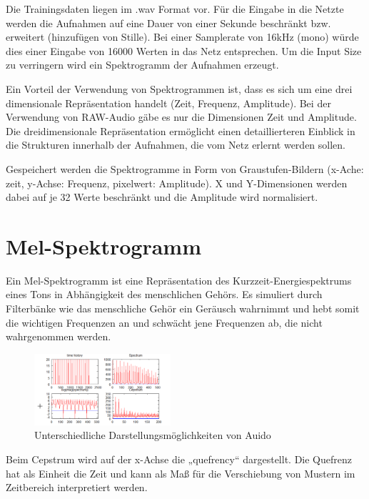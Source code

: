 \documentclass[sigconf]{acmart}
\begin{document}
Die Trainingsdaten liegen im .wav Format vor. Für die Eingabe in die Netzte werden die Aufnahmen auf eine Dauer von einer Sekunde beschränkt bzw. erweitert (hinzufügen von Stille). Bei einer Samplerate von 16kHz (mono) würde dies einer Eingabe von 16000 Werten in das Netz entsprechen. Um die Input Size zu verringern wird ein Spektrogramm der Aufnahmen erzeugt.  

Ein Vorteil der Verwendung von Spektrogrammen ist, dass es sich um eine drei dimensionale Repräsentation handelt (Zeit, Frequenz, Amplitude). Bei der Verwendung von RAW-Audio gäbe es nur die Dimensionen Zeit und Amplitude. Die dreidimensionale Repräsentation ermöglicht einen detaillierteren Einblick in die Strukturen innerhalb der Aufnahmen, die vom Netz erlernt werden sollen. 

Gespeichert werden die Spektrogramme in Form von Graustufen-Bildern (x-Ache: zeit, y-Achse: Frequenz, pixelwert: Amplitude). X und Y-Dimensionen werden dabei auf je 32 Werte beschränkt und die Amplitude wird normalisiert. 

\section{Mel-Spektrogramm}
Ein Mel-Spektrogramm ist eine Repräsentation des Kurzzeit-Energiespektrums eines Tons in Abhängigkeit des menschlichen Gehörs. Es simuliert durch Filterbänke wie das menschliche Gehör ein Geräusch wahrnimmt und hebt somit die wichtigen Frequenzen an und schwächt jene Frequenzen ab, die nicht wahrgenommen werden. 
\begin{figure}[H]
  \includegraphics[width=0.45\textwidth]{images/melexplanation}
  \caption{Unterschiedliche Darstellungsmöglichkeiten von Auido}
  \Description{}
  \label{fig:TrainingsDaten}
\end{figure}
Beim Cepstrum wird auf der x-Achse die „quefrency“ dargestellt. Die Quefrenz hat als Einheit die Zeit und kann als Maß für die Verschiebung von Mustern im Zeitbereich interpretiert werden. 
\newpage
\end{document}
